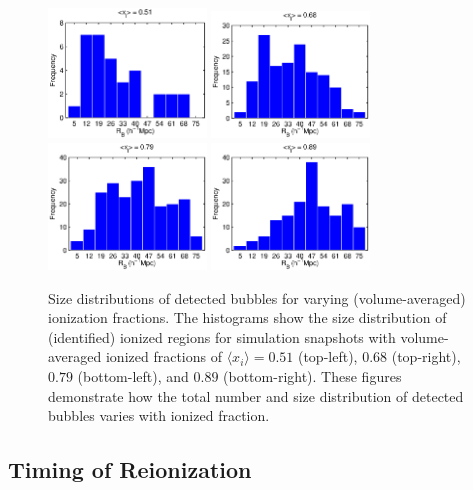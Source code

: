 \begin{figure}[h]
  \centering 
  \includegraphics[width=4.2cm]{f10a.eps}
  \includegraphics[width=4.2cm]{f10b.eps}
  \includegraphics[width=4.2cm]{f10c.eps}
  \includegraphics[width=4.2cm]{f10d.eps}
  \caption{Size distributions of detected bubbles for varying (volume-averaged) ionization fractions. 
    The histograms show the size distribution of (identified)  ionized regions 
for simulation snapshots with
    volume-averaged ionized fractions of $\langle x_i \rangle = 0.51$ (top-left),
    $0.68$ (top-right), $0.79$ (bottom-left), and $0.89$
    (bottom-right). These figures demonstrate how the total number and size
    distribution of detected bubbles varies with ionized fraction.}
  \label{fig:SizeHists}
\end{figure}

\subsection{Timing of Reionization} \label{sec:BubbleTiming}

